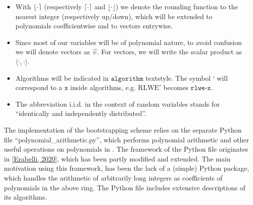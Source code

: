 \documentclass[letterpaper,10pt,english]{jupyterBook}
\begin{document}
\begin{DUlineblock}{0em}
\item[] 
\end{DUlineblock}
\begin{itemize}
\item {} 
\sphinxAtStartPar
With \(\left\lfloor \cdot \right\rceil\) (respectively \(\lceil \cdot \rceil\) and \(\lfloor \cdot \rfloor\)) we denote the rounding function to the nearest integer (respectively up/down), which will be extended to polynomials coefficient\sphinxhyphen{}wise and to vectors entry\sphinxhyphen{}wise.

\item {} 
\sphinxAtStartPar
Since most of our variables will be of polynomial nature, to avoid confusion we will denote vectors as \(\vec v\).
For vectors, we will write the scalar product as \(\langle \cdot, \cdot \rangle\).

\item {} 
\sphinxAtStartPar
Algorithms will be indicated in \(\texttt{algorithm}\) textstyle.
The symbol ‘ will correspond to a \(\texttt{x}\) inside algorithms, e.g. \(\mathrm{RLWE'}\) becomes \(\texttt{rlwe-x}\).

\item {} 
\sphinxAtStartPar
The abbreviation i.i.d. in the context of random variables stands for “identically and independently distributed”.

\end{itemize}

\begin{DUlineblock}{0em}
\item[] 
\end{DUlineblock}

\sphinxAtStartPar
The implementation of the bootstrapping scheme relies on the separate Python file “polynomial\_arithmetic.py”, which performs polynomial arithmetic and other useful operations on polynomials in {\hyperref[\detokenize{Thesis:the-ring-r}]{}}.
The framework of the Python file originates in {[}\hyperlink{cite.Thesis:id75}{Erabelli, 2020}{]}, which has been partly modified and extended.
The main motivation using this framework, has been the lack of a (simple) Python package, which handles the arithmetic of arbitrarily long integers as coefficients of polynomials in the above ring.
The Python file includes extensive descriptions of its algorithms.
\end{document}
